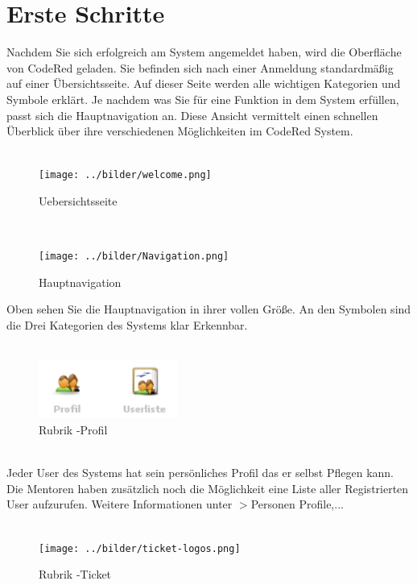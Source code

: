 \chapter{Erste Schritte}  %
\label{chapter:Erste Schritte}  %

Nachdem Sie sich erfolgreich am System angemeldet haben, wird die Oberfläche von CodeRed geladen. Sie befinden sich nach einer Anmeldung standardmäßig auf einer Übersichtsseite. Auf dieser Seite werden alle wichtigen Kategorien und Symbole erklärt. Je nachdem was Sie für eine Funktion in dem System erfüllen, passt sich die Hauptnavigation an. Diese Ansicht vermittelt einen schnellen Überblick über ihre verschiedenen Möglichkeiten im CodeRed System. \\
\\
\begin{figure}[h]
\begin{center}
   \texttt{[image: ../bilder/welcome.png]}
   \caption{Uebersichtsseite}
   \label{Uebersichtsseite}
\end{center}
\end{figure}
\\
\newpage
\begin{figure}[h]
   \texttt{[image: ../bilder/Navigation.png]}
   \caption{Hauptnavigation}
   \label{Hauptnavigation}
\end{figure}
Oben sehen Sie die Hauptnavigation in ihrer vollen Größe. An den Symbolen sind die Drei Kategorien des Systems klar Erkennbar. \\
\\
\begin{figure}[h]
   \centerline{\includegraphics[width=130pt]{../bilder/Profil-logos.png}}
   \caption{Rubrik -Profil}
   \label{Rubrik -Profil}
\end{figure}
\\
Jeder User des Systems hat sein persönliches Profil das er selbst Pflegen kann. Die Mentoren haben zusätzlich noch die Möglichkeit eine Liste aller Registrierten User aufzurufen. Weitere Informationen unter $>$Personen Profile,...\\
\\
\begin{figure}[h]
   \centerline{\texttt{[image: ../bilder/ticket-logos.png]}}
   \caption{Rubrik -Ticket}
   \label{Rubrik -Ticket}
\end{figure}
